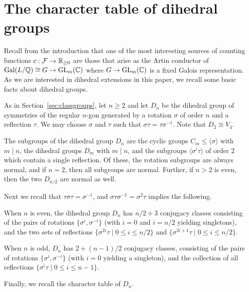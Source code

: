 \section{The character table of dihedral groups}\label{sec:dihedralgroups}

Recall from the introduction that one of the most interesting sources of
counting functions $c : \mathcal{F} \to \mathbb{R}_{\geq 0}$ are those that arise as the Artin
conductor of $\operatorname{Gal}(L/\mathbb{Q}) \cong G \to \operatorname{GL}_m(\mathbb{C})$ where $G \to \operatorname{GL}_m(\mathbb{C})$ is a
fixed Galois representation. As we are interested in dihedral extensions in
this paper, we recall some basic facts about dihedral groups.

As in Section~\ref{sec:classgroups}, let $n \geq 2$ and let $D_n$ be the
dihedral group of symmetries of the regular $n$-gon generated by a rotation
$\sigma$ of order $n$ and a reflection $\tau$. We may choose $\sigma$ and
$\tau$ such that $\sigma\tau = \tau\sigma^{-1}$. Note that $D_2 \cong V_4$.

\begin{prop}\label{prop:dnsubgroups}
  The subgroups of the dihedral group $D_n$ are the cyclic groups $C_m \leq
\langle \sigma \rangle$ with $m \mid n$, the dihedral groups $D_m$ with $m \mid
n$, and the subgroups $\langle \sigma^i \tau \rangle$ of order $2$ which
contain a single reflection. Of these, the rotation subgroups are always
normal, and if $n = 2$, then all subgroups are normal. Further, if $n > 2$ is
even, then the two $D_{n/2}$ are normal as well.
\end{prop}

Next we recall that $\tau\sigma\tau = \sigma^{-1}$, and $\sigma\tau\sigma^{-1}
= \sigma^2\tau$ implies the following.

\begin{prop}\label{prop:dnconjclasses}
  When $n$ is even, the dihedral group $D_n$ has $n/2 + 3$ conjugacy classes
consisting of the pairs of rotations $\{ \sigma^i, \sigma^{-i} \}$ (with $i =
0$ and $i = n/2$ yielding singletons), and the two sets of reflections $\{
\sigma^{2i}\tau \mid 0 \leq i \leq n/2 \}$ and $\{ \sigma^{2i+1}\tau \mid 0
\leq i \leq n/2 \}$.

  When $n$ is odd, $D_n$ has $2 + (n - 1)/2$ conjugacy classes, consisting of
the pairs of rotations $\{ \sigma^i, \sigma^{-i} \}$ (with $i = 0$ yielding a
singleton), and the collection of all reflections $\{ \sigma^i\tau \mid 0 \leq
i \leq n - 1 \}$.
\end{prop}

Finally, we recall the character table of $D_n$.

